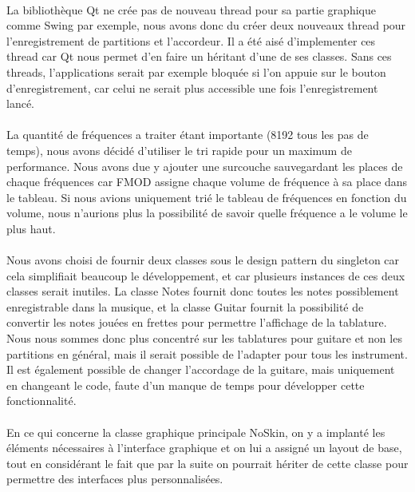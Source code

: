 \paragraph{}
La bibliothèque Qt ne crée pas de nouveau thread pour sa partie graphique comme Swing par exemple, nous avons donc du créer deux nouveaux 
thread pour l'enregistrement de partitions et l'accordeur. Il a été aisé d'implementer ces thread car Qt nous permet d'en 
faire un héritant d'une de ses classes. Sans ces threads, l'applications serait par exemple bloquée si l'on appuie sur le 
bouton d'enregistrement, car celui ne serait plus accessible une fois l'enregistrement lancé.

\paragraph{}
La quantité de fréquences a traiter étant importante (8192 tous les pas de temps), nous avons décidé d'utiliser 
le tri rapide pour un maximum de performance. Nous avons due y ajouter une surcouche sauvegardant les places de chaque fréquences 
car FMOD assigne chaque volume de fréquence à sa place dans le tableau. Si nous avions uniquement trié le tableau de fréquences 
en fonction du volume, nous n'aurions plus la possibilité de savoir quelle fréquence a le volume le plus haut. 

\paragraph{}
Nous avons choisi de fournir deux classes sous le design pattern du singleton car cela simplifiait beaucoup le développement, et 
car plusieurs instances de ces deux classes serait inutiles. La classe Notes fournit donc toutes les notes possiblement enregistrable 
dans la musique, et la classe Guitar fournit la possibilité de convertir les notes jouées en frettes pour permettre l'affichage de la 
tablature. Nous nous sommes donc plus concentré sur les tablatures pour guitare et non les partitions en général, 
mais il serait possible de l'adapter pour tous les instrument. Il est également possible de changer l'accordage de la guitare, mais 
uniquement en changeant le code, faute d'un manque de temps pour développer cette fonctionnalité.

\paragraph{}
En ce qui concerne la classe graphique principale NoSkin, on y a implanté les éléments nécessaires à l'interface graphique et on lui a assigné un layout de base, tout en considérant le fait que par la suite on pourrait hériter de cette classe pour permettre des interfaces plus personnalisées.
